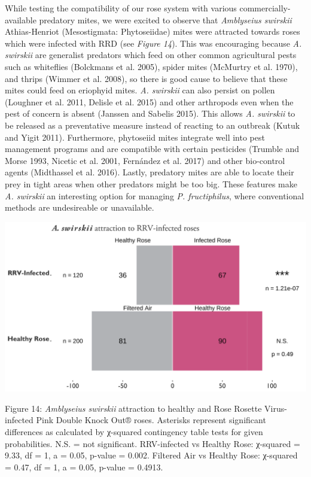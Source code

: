 \documentclass[12pt,final,CPage]{ufthesis}
\begin{document}
{  While testing the compatibility of our rose system with various commercially-available predatory mites, we were excited to observe that \emph{Amblyseius swirskii} Athias-Henriot (Mesostigmata: Phytoseiidae) mites were attracted towards roses which were infected with RRD (see \emph{Figure 14}). This was encouraging because \emph{A. swirskii} are generalist predators which feed on other common agricultural pests such as whiteflies (Bolckmans et al. 2005), spider mites (McMurtry et al. 1970), and thrips (Wimmer et al. 2008), so there is good cause to believe that these mites could feed on eriophyid mites. \emph{A. swirskii} can also persist on pollen (Loughner et al. 2011, Delisle et al. 2015) and other arthropods even when the pest of concern is absent (Janssen and Sabelis 2015). This allows \emph{A. swirskii} to be released as a preventative measure instead of reacting to an outbreak (Kutuk and Yigit 2011). Furthermore, phytoseiid mites integrate well into pest management programs and are compatible with certain pesticides (Trumble and Morse 1993, Nicetic et al. 2001, Fernández et al. 2017) and other bio-control agents (Midthassel et al. 2016). Lastly, predatory mites are able to locate their prey in tight areas when other predators might be too big. These features make \emph{A. swirskii} an interesting option for managing \emph{P. fructiphilus}, where conventional methods are undesireable or unavailable.
  \begin{center}\includegraphics[width=0.8\linewidth]{figure/rose_graph} \end{center}

  Figure 14: \emph{Amblyseius swirskii} attraction to healthy and Rose Rosette Virus-infected Pink Double Knock Out® roses. Asterisks represent significant differences as calculated by χ-squared contingency table tests for given probabilities. N.S. = not significant. RRV-infected vs Healthy Rose: χ-squared = 9.33, df = 1, a = 0.05, p-value = 0.002. Filtered Air vs Healthy Rose: χ-squared = 0.47, df = 1, a = 0.05, p-value = 0.4913.

}
\end{document}
